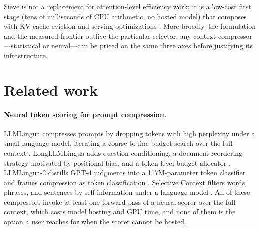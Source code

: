 \documentclass[pdflatex,sn-basic]{sn-jnl}
\theoremstyle{remark}
\newcommand{\method}{Sieve}
\begin{document}
\method{} is not a replacement for attention-level efficiency work; it
is a low-cost first stage (tens of milliseconds of CPU arithmetic, no
hosted model) that composes with KV cache eviction
\citep{zhang2023h2o,xiao2023streaming} and serving optimizations
\citep{dao2022flashattention,kwon2023vllm}. More broadly, the
formulation and the measured frontier outlive the particular selector:
any context compressor---statistical or neural---can be priced on the
same three axes before justifying its infrastructure.

\section{Related work}
\label{sec:related}

\paragraph{Neural token scoring for prompt compression.}
LLMLingua compresses prompts by dropping tokens with high perplexity
under a small language model, iterating a coarse-to-fine budget search
over the full context \citep{jiang2023llmlingua}. LongLLMLingua adds
question conditioning, a document-reordering strategy motivated by
positional bias, and a token-level budget allocator
\citep{jiang2023longllmlingua}. LLMLingua-2 distills GPT-4 judgments
into a 117M-parameter token classifier and frames compression as token
classification \citep{pan2024llmlingua2}. Selective Context filters
words, phrases, and sentences by self-information under a language
model \citep{li2023selective}. All of these compressors invoke at least
one forward pass of a neural scorer over the full context, which costs
model hosting and GPU time, and none of them is the option a user
reaches for when the scorer cannot be hosted.
\end{document}
